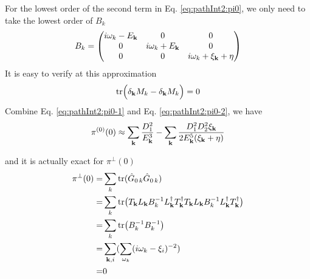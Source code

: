 For the lowest order of the second term in Eq. \eqref{eq:pathInt2:pi0}, we only need to take the lowest order of $B_{k}$
\begin{equation}
B_{k}=\begin{pmatrix}i\omega_{k}-E_{\mathbf{k}}&0&0\\0&i\omega_{k}+E_{\mathbf{k}}&0\\0&0&i\omega_{k}+\xi_{\mathbf{k}}+\eta\end{pmatrix}
\end{equation}
It is easy to verify at this approximation
\begin{equation}\label{eq:pathInt2:pi0-2}
\text{tr}\Big(\delta_{\mathbf{k}}M_{k}-\delta_{\mathbf{k}}M_{k}\Big)=0
\end{equation}
Combine Eq. \eqref{eq:pathInt2:pi0-1} and Eq. \eqref{eq:pathInt2:pi0-2}, we have 
\begin{equation}
\pi^{(0)}(0)\approx\sum_{\mathbf{k}}\frac{D_{1}^{2}}{E_{\mathbf{k}}^{3}}-\sum_{\mathbf{k}}\frac{D_{1}^{2}D_{2}^{2}\xi_{\mathbf{k}}}{2E_{\mathbf{k}}^{5}(\xi_{\mathbf{k}}+\eta)}\end{equation}

and it is actually exact for $\pi^{\perp}(0)$
\begin{equation}
\begin{split}
\pi^{\perp}(0)=&\sum_k\text{tr}(\hat{G}_{0\,k}\hat{G}_{0\,k})\\
	=&\sum_k\text{tr}\big(T_{\mathbf{k}}L_{\mathbf{k}}B_{k}^{-1}L_{\mathbf{k}}^{\dagger}T_{\mathbf{k}}^{\dagger}T_{\mathbf{k}}L_{\mathbf{k}}B_{k}^{-1}L_{\mathbf{k}}^{\dagger}T_{\mathbf{k}}^{\dagger}\big)\\
	=&\sum_k\text{tr}\big(B_{k}^{-1}B_{k}^{-1}\big)\\
	=&\sum_{\mathbf{k},i}(\sum_{\omega_{k}}(i\omega_{k}-\xi_{i})^{-2})\\
	=&0
\end{split}
\end{equation}



